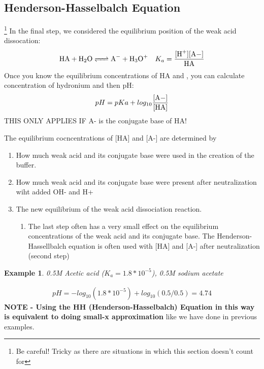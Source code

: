 \documentclass[../CHEM152Notes.tex]{subfiles}
\newtheorem{exmp}{Example}
\begin{document}
\subsection*{Henderson-Hasselbalch Equation}\footnote{Be careful! Tricky as there are situations in which this section doesn't count for}
In the final step, we considered the equilibrium position of the weak acid dissocation:
\begin{equation*}
    \begin{aligned}
        \ce{HA + H2O <=> A- + H3O+} \quad K_a = \ce{\frac{[H+][A-]}{HA}} 
    \end{aligned}
\end{equation*}
Once you know the equilibrium concentrations of HA and , you can calculate concentration of hydronium and then pH:
\begin{equation*}
    \begin{aligned}
        pH = pKa + log_{10}\ce{\frac{[A-]}{[HA]}}
    \end{aligned}
\end{equation*}
THIS ONLY APPLIES IF A- is the conjugate base of HA!

The equilibrium cocncentrations of [HA] and [A-] are determined by 
\begin{enumerate}
    \item How much weak acid and its conjugate base were used in the creation of the buffer.
    \item How much weak acid and its conjugate base were present after neutralization wiht added OH- and H+
    \item The new equilibrium of the weak acid dissociation reaction.
    \begin{enumerate}
        \item The last step often has a very small effect on the equilibrium concentrations of the weak acid and its conjugate base. The Henderson-Hassellbalch equation is often used with [HA] and [A-] after neutralization (second step) 
    \end{enumerate}
\end{enumerate}
\begin{exmp}
    0.5M Acetic acid ($K_a = 1.8*10^{-5}$), 0.5M sodium acetate
\end{exmp}
\begin{equation*}
    \begin{aligned}
        pH = -log_{10}(1.8*10^{-5}) + log_{10}(0.5/0.5) = 4.74
    \end{aligned}
\end{equation*}
\textbf{NOTE - Using the HH (Henderson-Hasselbalch) Equation in this way is equivalent to doing small-x approximation} like we have done in previous examples.
\end{document}
